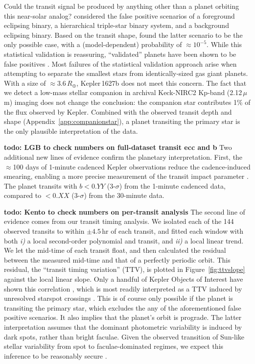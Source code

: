 \documentclass[12pt,modern,twocolumn,tighten]{aastex63}
\begin{document}
Could the transit signal be produced by anything other than a planet
orbiting this near-solar analog?  \citet{morton_false_2016} considered
the false positive scenarios of a foreground eclipsing binary, a
hierarchical triple-star binary system, and a background eclipsing
binary.  Based on the transit shape, \citet{morton_false_2016} found
the latter scenario to be the only possible case, with a
(model-dependent) probability of $\approx10^{-5}$.  While this
statistical validation is reassuring, ``validated'' planets have been
shown to be false positives \citep{shporer_three_2017}.  Most
failures of the statistical validation approach arise when attempting
to separate the smallest stars from identically-sized gas giant
planets.  With a size of $\approx 3.6\,R_\oplus$, Kepler\,1627b does
not meet this concern.  The fact that we detect a low-mass stellar
companion in archival Keck-NIRC2 Kp-band (2.12\,$\mu $m) imaging does
not change the conclusion: the companion star contributes 1\% of the
flux observed by Kepler.  Combined with the observed transit depth and
shape (Appendix~\ref{app:companionstar}), a planet transiting the
primary star is the only plausible interpretation of the
data.

{\bf todo: LGB to check numbers on full-dataset transit ecc and b} 
Two additional new lines of evidence confirm the planetary
interpretation.  First, the $\approx$100 days of 1-minute
cadenced Kepler observations reduce the cadence-induced smearing,
enabling a more precise measurement of the transit impact parameter
\citep{kipping_binning_2010}.  The planet transits with $b<0.YY$
(3-$\sigma$) from the 1-minute cadenced data, compared to $<0.XX$
(3-$\sigma$) from the 30-minute data.

{\bf todo: Kento to check numbers on per-transit analysis} 
The second line of evidence comes from our transit timing analysis. We
isolated each of the 144 observed transits to within $\pm4.5$\,hr of
each transit, and fitted each window with both {\it i)} a local
second-order polynomial and transit, and {\it ii)} a local linear
trend.  We let the mid-time of each transit float, and then calculated
the residual between the measured mid-time and that of a perfectly
periodic orbit.  This residual, the ``transit timing variation''
(TTV), is plotted in Figure~\ref{fig:ttvslope} against the local
linear slope.  Only a handful of Kepler Objects of Interest have shown
this correlation \citep{holczer_time_2015}, which is most readily
interpreted as a TTV induced by unresolved starspot crossings
\citep{mazeh_time_2015}.  This is of course only possible if the
planet is transiting the primary star, which excludes the any of the
aforementioned false positive scenarios.  It also implies that the
planet's orbit is prograde.  The latter interpretation assumes that
the dominant photometric variability is induced by dark spots, rather
than bright faculae.  Given the observed transition of Sun-like
stellar variability from spot to faculae-dominated regimes, we expect
this inference to be reasonably secure
\citep{shapiro_are_2016,montet_long-term_2017,reinhold_stellar_2020}.
\end{document}
